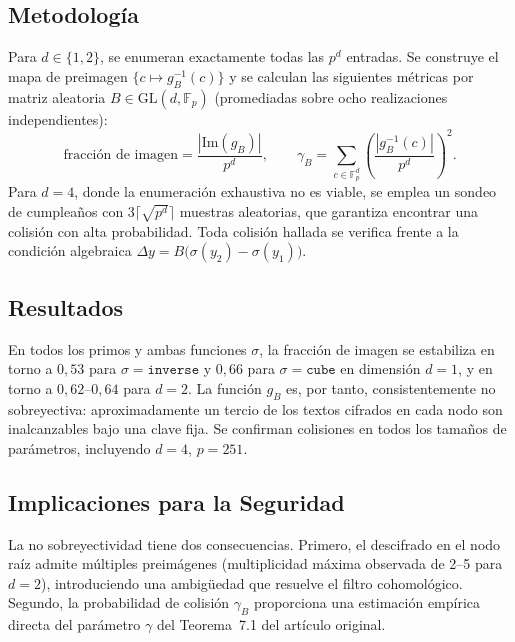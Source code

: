 \documentclass[12pt,a4paper]{article}
\theoremstyle{definition}
\newcommand{\Fp}{\mathbb{F}_p}
\newcommand{\GL}{\mathrm{GL}}
\newcommand{\Img}{\mathrm{Im}}
\begin{document}
\subsection{Metodología}

Para $d \in \{1, 2\}$, se enumeran exactamente todas las $p^d$
entradas. Se construye el mapa de preimagen $\{c \mapsto g_B^{-1}(c)\}$
y se calculan las siguientes métricas por matriz aleatoria
$B \in \GL(d, \Fp)$ (promediadas sobre ocho realizaciones
independientes):
\begin{equation}
  \text{fracción de imagen} = \frac{|\Img(g_B)|}{p^d}, \qquad
  \gamma_B = \sum_{c \in \Fp^d} \!\left(\frac{|g_B^{-1}(c)|}{p^d}\right)^{\!2}.
\end{equation}
Para $d = 4$, donde la enumeración exhaustiva no es viable, se emplea
un sondeo de cumpleaños con $3\lceil\sqrt{p^d}\rceil$ muestras
aleatorias, que garantiza encontrar una colisión con alta probabilidad.
Toda colisión hallada se verifica frente a la condición algebraica
$\Delta y = B\bigl(\sigma(y_2) - \sigma(y_1)\bigr)$.

\subsection{Resultados}

En todos los primos y ambas funciones $\sigma$, la fracción de imagen
se estabiliza en torno a $0{,}53$ para $\sigma = \texttt{inverse}$ y
$0{,}66$ para $\sigma = \texttt{cube}$ en dimensión $d = 1$, y en torno
a $0{,}62$--$0{,}64$ para $d = 2$. La función $g_B$ es, por tanto,
consistentemente no sobreyectiva: aproximadamente un tercio de los
textos cifrados en cada nodo son inalcanzables bajo una clave fija.
Se confirman colisiones en todos los tamaños de parámetros, incluyendo
$d = 4$, $p = 251$.

\subsection{Implicaciones para la Seguridad}

La no sobreyectividad tiene dos consecuencias. Primero, el descifrado
en el nodo raíz admite múltiples preimágenes (multiplicidad máxima
observada de 2--5 para $d = 2$), introduciendo una ambigüedad que
resuelve el filtro cohomológico. Segundo, la probabilidad de colisión
$\gamma_B$ proporciona una estimación empírica directa del parámetro
$\gamma$ del Teorema~7.1 del artículo original.

\end{document}
